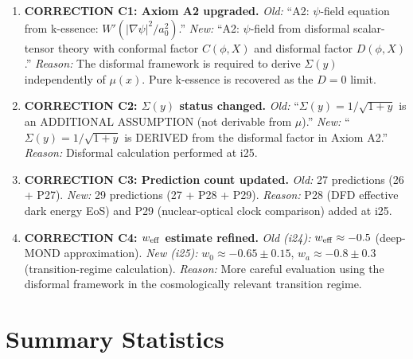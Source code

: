 \documentclass[11pt]{article}
\newcommand{\aM}{a_0}
\begin{document}
\begin{tcolorbox}[colback=orange!5!white, colframe=orange!70!black,
  title=\textbf{CORRECTIONS FROM i24}]

\begin{enumerate}

\item \textbf{CORRECTION C1: Axiom A2 upgraded.}
  \emph{Old:} ``A2: $\psi$-field equation from k-essence:
  $W'(|\nabla\psi|^2/\aM^2)$.''
  \emph{New:} ``A2: $\psi$-field from disformal scalar-tensor theory
  with conformal factor $C(\phi,X)$ and disformal factor $D(\phi,X)$.''
  \emph{Reason:} The disformal framework is required to derive
  $\Sigma(y)$ independently of $\mu(x)$. Pure k-essence is recovered
  as the $D = 0$ limit.

\item \textbf{CORRECTION C2: $\Sigma(y)$ status changed.}
  \emph{Old:} ``$\Sigma(y) = 1/\sqrt{1+y}$ is an ADDITIONAL ASSUMPTION
  (not derivable from $\mu$).''
  \emph{New:} ``$\Sigma(y) = 1/\sqrt{1+y}$ is DERIVED from the
  disformal factor in Axiom A2.''
  \emph{Reason:} Disformal calculation performed at i25.

\item \textbf{CORRECTION C3: Prediction count updated.}
  \emph{Old:} 27 predictions (26 + P27).
  \emph{New:} 29 predictions (27 + P28 + P29).
  \emph{Reason:} P28 (DFD effective dark energy EoS) and P29
  (nuclear-optical clock comparison) added at i25.

\item \textbf{CORRECTION C4: $w_{\rm eff}$ estimate refined.}
  \emph{Old (i24):} $w_{\rm eff} \approx -0.5$ (deep-MOND
  approximation).
  \emph{New (i25):} $w_0 \approx -0.65 \pm 0.15$, $w_a \approx -0.8 \pm 0.3$
  (transition-regime calculation).
  \emph{Reason:} More careful evaluation using the disformal framework
  in the cosmologically relevant transition regime.

\end{enumerate}
\end{tcolorbox}


\section{Summary Statistics}
\end{document}
